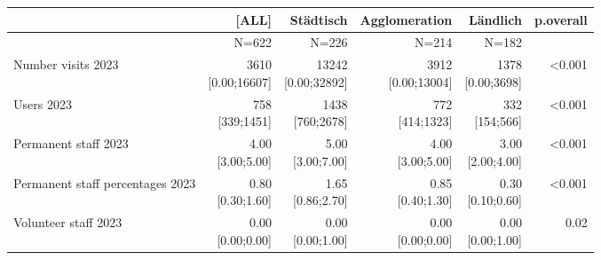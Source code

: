 \documentclass[a4paper,
fontsize=11pt,
oneside,
numbers=noperiodatend,
parskip=half-,
bibliography=totoc,
final
]{scrartcl}
\begin{document}
\begin{landscape}
\begin{table}[]\centering
\begin{tabular}{lrrrrr}
\hline
                                 & \textbf{{[}ALL{]}}       & \textbf{Städtisch}        & \textbf{Agglomeration}   & \textbf{Ländlich}      & \textbf{p.overall} \\ \hline
                                 & N=622                    & N=226                     & N=214                    & N=182                  &                    \\ \hline
Number visits 2023               & \makecell{ 3610 \\ {[}0.00;16607{]}}    & \makecell{ 13242 \\ {[}0.00;32892{]}}    & \makecell{ 3912 \\ {[}0.00;13004{]}}    & \makecell{ 1378 \\ {[}0.00;3698{]}}   & \textless{}0.001   \\ \hline
Users 2023                       & \makecell{ 758 \\ {[}339;1451{]}}       & \makecell{ 1438 \\ {[}760;2678{]}}       & \makecell{ 772 \\ {[}414;1323{]}}       & \makecell{ 332 \\ {[}154;566{]}}      & \textless{}0.001   \\ \hline
Permanent staff 2023             & \makecell{ 4.00 \\ {[}3.00;5.00{]}}     & \makecell{ 5.00 \\ {[}3.00;7.00{]}}      & \makecell{ 4.00 \\ {[}3.00;5.00{]}}     & \makecell{ 3.00 \\ {[}2.00;4.00{]}}   & \textless{}0.001   \\ \hline
Permanent staff percentages 2023 & \makecell{ 0.80 \\ {[}0.30;1.60{]}}     & \makecell{ 1.65 \\ {[}0.86;2.70{]}}      & \makecell{ 0.85 \\ {[}0.40;1.30{]}}     & \makecell{ 0.30 \\ {[}0.10;0.60{]}}   & \textless{}0.001   \\ \hline
Volunteer staff 2023             & \makecell{ 0.00 \\ {[}0.00;0.00{]}}     & \makecell{ 0.00 \\ {[}0.00;1.00{]}}      & \makecell{ 0.00 \\ {[}0.00;0.00{]}}     & \makecell{ 0.00 \\ {[}0.00;1.00{]}}   & 0.02               \\ \hline

\end{tabular}
\end{table}
\end{landscape}
\end{document}
